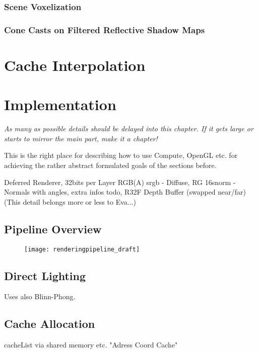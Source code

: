 \documentclass[thesis.tex]{subfiles}
\begin{document}
\subsubsection{Scene Voxelization}

\subsubsection{Cone Casts on Filtered Reflective Shadow Maps}


\section{Cache Interpolation}



\section{Implementation}

\emph{As many as possible details should be delayed into this chapter. If it gets large or starts to mirror the main part, make it a chapter!}

This is the right place for describing how to use Compute, OpenGL etc. for achieving the rather abstract formulated goals of the sections before.

Deferred Renderer, 32bits per Layer RGB(A) srgb - Diffuse, RG 16snorm - Normals with angles, extra infos todo, R32F Depth Buffer (swapped near/far)\\
(This detail belongs more or less to Eva...)

\subsection{Pipeline Overview}

\begin{figure}[h]
	\centering
	\texttt{[image: renderingpipeline\_draft]}
\end{figure}



\subsection{Direct Lighting}
Uses also Blinn-Phong.

\subsection{Cache Allocation} \label{sec:impl:cachealloc}
cacheList via shared memory etc.
"Adress Coord Cache"

\subfilebib %
\end{document}
